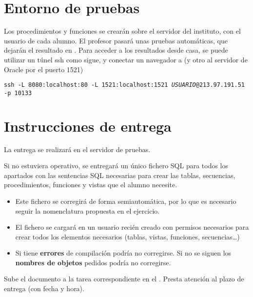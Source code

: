 \section{Entorno de pruebas}
Los procedimientos y funciones se crearán sobre el servidor del instituto, con el usuario de cada alumno. El profesor pasará unas pruebas automáticas, que dejarán el resultado en . Para acceder a los resultados desde casa, se puede utilizar un túnel ssh como sigue, y conectar un navegador a  (y otro al servidor de Oracle por el puerto 1521)
\begin{center}
\texttt{ssh -L 8080:localhost:80 -L 1521:localhost:1521 \textit{USUARIO}@213.97.191.51 -p 10133}
\end{center}

\section{Instrucciones de entrega}
La entrega se realizará en el servidor de pruebas.

Si no estuviera operativo, se entregará un único fichero SQL para todos los apartados con las sentencias SQL necesarias para crear las tablas, secuencias, procedimientos, funciones y vistas que el alumno necesite.
\begin{itemize}
\item Este fichero se corregirá de forma semiautomática, por lo que es necesario seguir la nomenclatura propuesta en el ejercicio.
\item El fichero se cargará en un usuario recién creado con permisos necesarios para crear todos los elementos necesarios (tablas, vistas, funciones, secuencias\dots)
\item Si tiene \textbf{errores} de compilación podría no corregirse. Si no se siguen los \textbf{nombres de objetos} pedidos podría no corregirse.
\end{itemize}

Sube el documento a la tarea correspondiente en el .
Presta atención al plazo de entrega (con fecha y hora).







